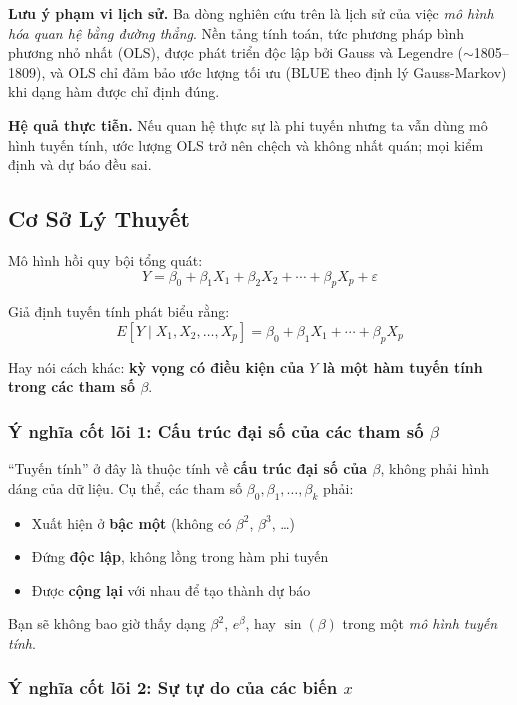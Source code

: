 \documentclass[12pt, a4paper]{article}
\begin{document}
\textbf{Lưu ý phạm vi lịch sử.} Ba dòng nghiên cứu trên là lịch sử của việc \textit{mô hình hóa quan hệ bằng đường thẳng}. Nền tảng tính toán, tức phương pháp bình phương nhỏ nhất (OLS), được phát triển độc lập bởi Gauss và Legendre ($\sim$1805--1809), và OLS chỉ đảm bảo ước lượng tối ưu (BLUE theo định lý Gauss-Markov) khi dạng hàm được chỉ định đúng.

\textbf{Hệ quả thực tiễn.} Nếu quan hệ thực sự là phi tuyến nhưng ta vẫn dùng mô hình tuyến tính, ước lượng OLS trở nên chệch và không nhất quán; mọi kiểm định và dự báo đều sai.

\subsection{Cơ Sở Lý Thuyết}

Mô hình hồi quy bội tổng quát:
\[
  Y = \beta_0 + \beta_1 X_1 + \beta_2 X_2 + \cdots + \beta_p X_p + \varepsilon
\]

Giả định tuyến tính phát biểu rằng:
\[
  E[Y \mid X_1, X_2, \ldots, X_p] = \beta_0 + \beta_1 X_1 + \cdots + \beta_p X_p
\]

Hay nói cách khác: \textbf{kỳ vọng có điều kiện của $Y$ là một hàm tuyến tính trong các tham số $\beta$}.

\subsubsection{Ý nghĩa cốt lõi 1: Cấu trúc đại số của các tham số $\beta$}

``Tuyến tính'' ở đây là thuộc tính về \textbf{cấu trúc đại số của $\beta$}, không phải hình dáng của dữ liệu. Cụ thể, các tham số $\beta_0, \beta_1, \ldots, \beta_k$ phải:
\begin{itemize}
  \item Xuất hiện ở \textbf{bậc một} (không có $\beta^2$, $\beta^3$, \ldots)
  \item Đứng \textbf{độc lập}, không lồng trong hàm phi tuyến
  \item Được \textbf{cộng lại} với nhau để tạo thành dự báo
\end{itemize}

Bạn sẽ không bao giờ thấy dạng $\beta^2$, $e^{\beta}$, hay $\sin(\beta)$ trong một \textit{mô hình tuyến tính}.

\subsubsection{Ý nghĩa cốt lõi 2: Sự tự do của các biến $x$}
\end{document}
